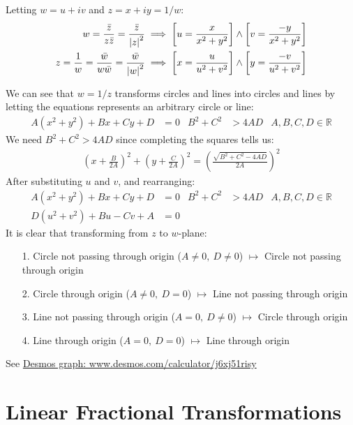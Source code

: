 \documentclass[12pt, english]{book}
\begin{document}
	Letting \(w = u + iv\) and \(z = x + iy = 1/w\):
	\begin{align*}
		w = \frac{\bar{z}}{z\bar{z}} = \frac{\bar{z}}{\abs{z}^2}
			&\implies \left[u = \frac{x}{x^2 + y^2}\right] \land \left[v = \frac{-y}{x^2 + y^2}\right] \\
		z = \frac{1}{w} = \frac{\bar{w}}{w\bar{w}} = \frac{\bar{w}}{\abs{w}^2}
			&\implies \left[x = \frac{u}{u^2 + v^2}\right] \land \left[y = \frac{-v}{u^2 + v^2}\right] 
	\end{align*}
	
	We can see that \(w = 1/z\) transforms circles and lines into circles and lines by letting the equations represents an arbitrary circle or line:
	\begin{align*}
		A(x^2 + y^2) + Bx + Cy + D &= 0 &
		B^2 + C^2 &> 4AD	&	A,B,C,D \in \mathbb{R} 
	\end{align*}
	We need \(B^2 + C^2 > 4AD\) since completing the squares tells us:
	\begin{align*}
		\left(x + \frac{B}{2A}\right)^2 + \left(y + \frac{C}{2A}\right)^2 
		= \left(\frac{\sqrt{B^2 + C^2 - 4AD}}{2A}\right)^2
	\end{align*}
	After substituting \(u\) and \(v\), and rearranging:
	\begin{align*}
		A(x^2 + y^2) + Bx + Cy + D &= 0 &
			B^2 + C^2 &> 4AD	&	A,B,C,D \in \mathbb{R} \\
		D(u^2 + v^2) + Bu - Cv + A &= 0
	\end{align*}
	It is clear that transforming from \(z\) to \(w\)-plane:
	\begin{itemize}
		\item[1.] Circle not passing through origin (\(A \neq 0, \ D\neq 0\)) \(\mapsto\) Circle not passing through origin
		\item[2.] Circle through origin (\(A\neq 0, \ D = 0\)) \(\mapsto\) Line not passing through origin
		\item[3.] Line not passing through origin (\(A = 0, \ D \neq 0\)) \(\mapsto\) Circle through origin
		\item[4.] Line through origin (\(A = 0, \ D = 0\)) \(\mapsto\) Line through origin
	\end{itemize}

	See \hyperref{https://www.desmos.com/calculator/j6xj51risy}{Interactive Graph}{name}{Desmos graph: www.desmos.com/calculator/j6xj51risy}

	\section{Linear Fractional Transformations} \label{Linear Fractional Transformations Section - Complex}
		
\end{document}
